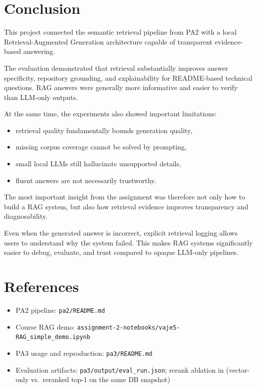 \documentclass[11pt,a4paper]{article}
\begin{document}
\section{Conclusion}
This project connected the semantic retrieval pipeline from PA2 with a local Retrieval-Augmented Generation architecture capable of transparent evidence-based answering.

The evaluation demonstrated that retrieval substantially improves answer specificity, repository grounding, and explainability for README-based technical questions. RAG answers were generally more informative and easier to verify than LLM-only outputs.

At the same time, the experiments also showed important limitations:

\begin{itemize}
  \item retrieval quality fundamentally bounds generation quality,
  \item missing corpus coverage cannot be solved by prompting,
  \item small local LLMs still hallucinate unsupported details,
  \item fluent answers are not necessarily trustworthy.
\end{itemize}

The most important insight from the assignment was therefore not only how to build a RAG system, but also how retrieval evidence improves transparency and diagnosability.

Even when the generated answer is incorrect, explicit retrieval logging allows users to understand why the system failed. This makes RAG systems significantly easier to debug, evaluate, and trust compared to opaque LLM-only pipelines.

\section*{References}
\begin{itemize}
  \item PA2 pipeline: \texttt{pa2/README.md}
  \item Course RAG demo: \texttt{assignment-2-notebooks/vaje5-RAG\_simple\_demo.ipynb}
  \item PA3 usage and reproduction: \texttt{pa3/README.md}
  \item Evaluation artifacts: \texttt{pa3/output/eval\_run.json}; rerank ablation in  (vector-only vs.\ reranked top-1 on the same DB snapshot)
\end{itemize}
\end{document}
